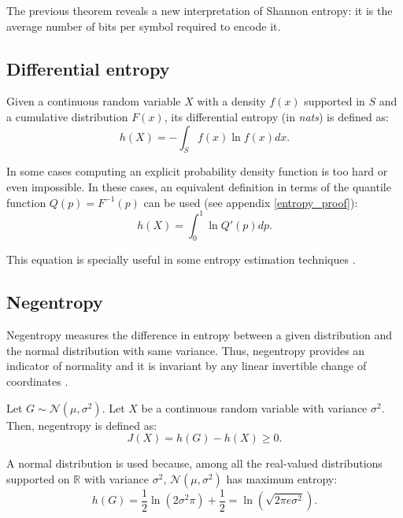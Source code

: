 The previous theorem reveals a new interpretation of Shannon entropy: it is the average number of bits per symbol required to encode it.

\subsection{Differential entropy}
Given a continuous random variable $X$ with a density $f(x)$ supported in $S$ and a cumulative distribution $F(x)$, its differential entropy (in \textit{nats}) is defined as:
\begin{equation} \label{eq:differential_entropy}
h(X) = - \int_{S}^{} f(x) \ln f(x) dx.
\end{equation}

In some cases computing an explicit probability density function is too hard or even impossible. In these cases, an equivalent definition in terms of the quantile function $Q(p) = F^{-1}(p)$ can be used (see appendix \ref{entropy_proof}):
\begin{equation} \label{eq:differential_entropy_q}
h(X) = \int_{0}^{1} \ln Q'(p) dp.
\end{equation}

This equation is specially useful in some entropy estimation techniques \parencite{Vasicek}.

\subsection{Negentropy} \label{sec:negentropy}
Negentropy measures the difference in entropy between a given distribution and the normal distribution with same variance. Thus, negentropy provides an indicator of normality and it is invariant by any linear invertible change of coordinates \parencite{negentropy}.

Let $G \sim \mathscr{N}(\mu, \sigma^2)$. Let $X$ be a continuous random variable with variance $\sigma^2$. Then, negentropy is defined as:
\begin{equation}
J(X) = h(G) - h(X) \geq 0.
\end{equation}

A normal distribution is used because, among all the real-valued distributions supported on $\mathbb{R}$ with variance $\sigma^2$, $\mathscr{N}(\mu, \sigma^2)$ has maximum entropy:
\begin{equation}
h(G) = \frac{1}{2} \ln \left(2\sigma^2\pi\right) + \frac{1}{2} = \ln\left(\sqrt{2\pi e \sigma^2}\right).
\end{equation}

